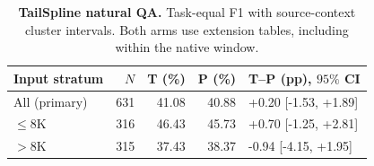 \begin{table}[ht]
\centering\small
\caption{\textbf{TailSpline natural QA.} Task-equal F1 with source-context cluster intervals. Both arms use extension tables, including within the native window.}
\label{tab:tailspline-natural-main}
\begin{tabular}{@{}lrrrl@{}}
\toprule
Input stratum & $N$ & T (\%) & P (\%) & T--P (pp), $95\%$ CI \\
\midrule
All (primary) & 631 & 41.08 & 40.88 & +0.20 [-1.53, +1.89] \\
$\le8$K & 316 & 46.43 & 45.73 & +0.70 [-1.25, +2.81] \\
$>8$K & 315 & 37.43 & 38.37 & -0.94 [-4.15, +1.95] \\
\bottomrule
\end{tabular}
\end{table}

